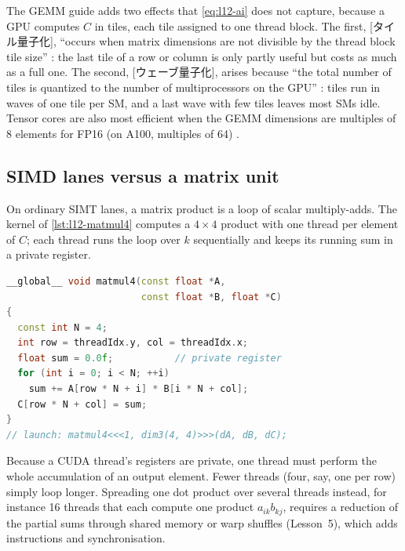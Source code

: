 \documentclass[../main.tex]{subfiles}
\begin{document}
The GEMM guide adds two effects that \cref{eq:l12-ai} does not
capture, because a GPU computes $C$ in tiles, each tile assigned to one
thread block.  The first, [タイル量子化], \enquote{occurs
when matrix dimensions are not divisible by the thread block tile size}
\cite[§3.1]{nvidia2026gemmguide}: the last tile of a row or column is
only partly useful but costs as much as a full one.  The second,
[ウェーブ量子化], arises because \enquote{the
total number of tiles is quantized to the number of multiprocessors on
the GPU} \cite[§3.2]{nvidia2026gemmguide}: tiles run in waves of one
tile per SM, and a last wave with few tiles leaves most SMs
idle.  Tensor cores are also most efficient
when the GEMM dimensions are multiples of 8 elements for FP16 (on A100,
multiples of 64) \cite[§2.2]{nvidia2026gemmguide}.

\subsection{SIMD lanes versus a matrix unit}

On ordinary SIMT lanes, a matrix product is a loop of scalar
multiply-adds.  The kernel of \cref{lst:l12-matmul4} computes a
$4 \times 4$ product with one thread per element of $C$; each thread
runs the loop over $k$ sequentially and keeps its running sum in a
private register.

\begin{lstlisting}[language=C++, numbers=none, caption={A $4 \times 4$ matrix product on SIMT lanes, one thread per output element.}, label={lst:l12-matmul4}]
__global__ void matmul4(const float *A,
                        const float *B, float *C)
{
  const int N = 4;
  int row = threadIdx.y, col = threadIdx.x;
  float sum = 0.0f;           // private register
  for (int i = 0; i < N; ++i)
    sum += A[row * N + i] * B[i * N + col];
  C[row * N + col] = sum;
}
// launch: matmul4<<<1, dim3(4, 4)>>>(dA, dB, dC);
\end{lstlisting}

Because a CUDA thread's registers are private, one thread must perform
the whole accumulation of an output element.  Fewer threads (four, say,
one per row) simply loop longer.  Spreading one dot product over
several threads instead, for instance 16 threads that each compute one
product $a_{ik} b_{kj}$, requires a reduction of the partial sums
through shared memory or warp shuffles (Lesson~5), which adds
instructions and synchronisation.
\end{document}
